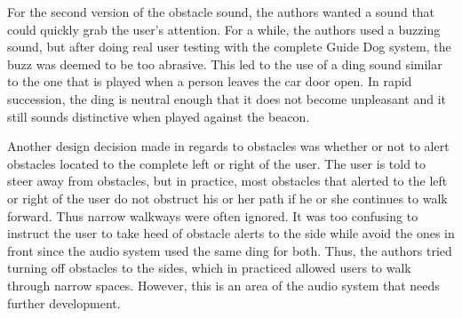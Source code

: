 For the second version of the obstacle sound, the authors wanted a sound that
could quickly grab the user's attention. For a while, the authors used a buzzing
sound, but after doing real user testing with the complete Guide Dog system,
the buzz was deemed to be too abrasive. This led to the use of a ding sound
similar to the one that is played when a person leaves the car door open. In
rapid succession, the ding is neutral enough that it does not become unpleasant
and it still sounds distinctive when played against the beacon.

Another design decision made in regards to obstacles was whether or not to alert
obstacles located to the complete left or right of the user. The user is told to
steer away from obstacles, but in practice, most obstacles that alerted to the
left or right of the user do not obstruct his or her path if he or she continues
to walk forward. Thus narrow walkways were often ignored. It was too confusing
to instruct the user to take heed of obstacle alerts to the side while avoid
the ones in front since the audio system used the same ding for both. Thus, the
authors tried turning off obstacles to the sides, which in practiced allowed
users to walk through narrow spaces. However, this is an area of the audio
system that needs further development.

